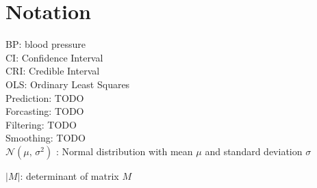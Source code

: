 \chapter*{Notation}
\label{c:Notation}

BP: blood pressure \\
CI: Confidence Interval \\
CRI: Credible Interval\\

OLS: Ordinary Least Squares \\
Prediction: TODO \\
Forcasting: TODO \\
Filtering: TODO \\
Smoothing: TODO \\

$\mathcal{N}(\mu,\,\sigma^{2})$ : Normal distribution with mean $\mu$ and standard deviation $\sigma$

$|M|$: determinant of matrix $M$

